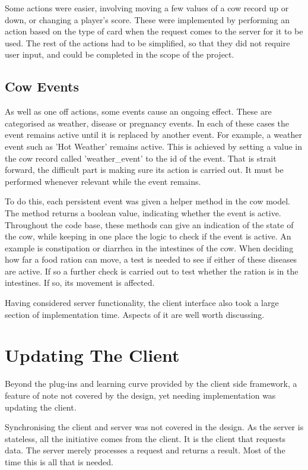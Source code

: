 Some actions were easier, involving moving a few values of a cow record up or down, or changing a player's score. These were implemented by performing an action based on the type of card when the request comes to the server for it to be used. The rest of the actions had to be simplified, so that they did not require user input, and could be completed in the scope of the project.

\subsection{Cow Events}
As well as one off actions, some events cause an ongoing effect. These are categorised as weather, disease or pregnancy events. In each of these cases the event remains active until it is replaced by another event. For example, a weather event such as 'Hot Weather' remains active. This is achieved by setting a value in the cow record called 'weather\_event' to the id of the event. That is strait forward, the difficult part is making sure its action is carried out. It must be performed whenever relevant while the event remains.

To do this, each persistent event was given a helper method in the cow model. The method returns a boolean value, indicating whether the event is active. Throughout the code base, these methods can give an indication of the state of the cow, while keeping in one place the logic to check if the event is active. An example is constipation or diarrhea in the intestines of the cow. When deciding how far a food ration can move, a test is needed to see if either of these diseases are active. If so a further check is carried out to test whether the ration is in the intestines. If so, its movement is affected.

Having considered server functionality, the client interface also took a large section of implementation time. Aspects of it are well worth discussing.

\section{Updating The Client}
Beyond the plug-ins and learning curve provided by the client side framework, a feature of note not covered by the design, yet needing implementation was updating the client.

Synchronising the client and server was not covered in the design. As the server is stateless, all the initiative comes from the client. It is the client that requests data. The server merely processes a request and returns a result. Most of the time this is all that is needed.

